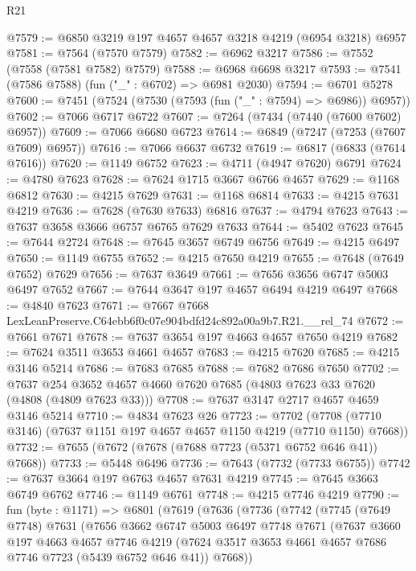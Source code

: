 \begin{lexlean}{R21}
\begin{coremodule}
@7579 := @6850 @3219 @197 @4657 @4657 @3218 @4219 (@6954 @3218) @6957
@7581 := @7564 (@7570 @7579)
@7582 := @6962 @3217
@7586 := @7552 (@7558 (@7581 @7582) @7579)
@7588 := @6968 @6698 @3217
@7593 := @7541 (@7586 @7588) (fun ("_" : @6702) => @6981 @2030)
@7594 := @6701 @5278
@7600 := @7451 (@7524 (@7530 (@7593 (fun ("_" : @7594) => @6986)) @6957))
@7602 := @7066 @6717 @6722
@7607 := @7264 (@7434 (@7440 (@7600 @7602) @6957))
@7609 := @7066 @6680 @6723
@7614 := @6849 (@7247 (@7253 (@7607 @7609) @6957))
@7616 := @7066 @6637 @6732
@7619 := @6817 (@6833 (@7614 @7616))
@7620 := @1149 @6752
@7623 := @4711 (@4947 @7620) @6791
@7624 := @4780 @7623
@7628 := @7624 @1715 @3667 @6766 @4657
@7629 := @1168 @6812
@7630 := @4215 @7629
@7631 := @1168 @6814
@7633 := @4215 @7631 @4219
@7636 := @7628 (@7630 @7633) @6816
@7637 := @4794 @7623
@7643 := @7637 @3658 @3666 @6757 @6765 @7629 @7633
@7644 := @5402 @7623
@7645 := @7644 @2724
@7648 := @7645 @3657 @6749 @6756
@7649 := @4215 @6497
@7650 := @1149 @6755
@7652 := @4215 @7650 @4219
@7655 := @7648 (@7649 @7652) @7629
@7656 := @7637 @3649
@7661 := @7656 @3656 @6747 @5003 @6497 @7652
@7667 := @7644 @3647 @197 @4657 @6494 @4219 @6497
@7668 := @4840 @7623
@7671 := @7667 @7668 LexLeanPreserve.C64ebb6f0c07e904bdfd24c892a00a9b7.R21.__rel_74
@7672 := @7661 @7671
@7678 := @7637 @3654 @197 @4663 @4657 @7650 @4219
@7682 := @7624 @3511 @3653 @4661 @4657
@7683 := @4215 @7620
@7685 := @4215 @3146 @5214
@7686 := @7683 @7685
@7688 := @7682 @7686 @7650
@7702 := @7637 @254 @3652 @4657 @4660 @7620 @7685 (@4803 @7623 @33 @7620 (@4808 (@4809 @7623 @33)))
@7708 := @7637 @3147 @2717 @4657 @4659 @3146 @5214
@7710 := @4834 @7623 @26
@7723 := @7702 (@7708 (@7710 @3146) (@7637 @1151 @197 @4657 @4657 @1150 @4219 (@7710 @1150) @7668))
@7732 := @7655 (@7672 (@7678 (@7688 @7723 (@5371 @6752 @646 @41)) @7668))
@7733 := @5448 @6496
@7736 := @7643 (@7732 (@7733 @6755))
@7742 := @7637 @3664 @197 @6763 @4657 @7631 @4219
@7745 := @7645 @3663 @6749 @6762
@7746 := @1149 @6761
@7748 := @4215 @7746 @4219
@7790 := fun (byte : @1171) =>
  @6801
    (@7619
      (@7636
        (@7736
          (@7742
            (@7745
              (@7649 @7748)
              @7631
              (@7656
                @3662
                @6747
                @5003
                @6497
                @7748
                @7671
                (@7637
                  @3660
                  @197
                  @4663
                  @4657
                  @7746
                  @4219
                  (@7624 @3517 @3653 @4661 @4657 @7686 @7746 @7723 (@5439 @6752 @646 @41))
                  @7668))

\end{coremodule}
\end{lexlean}
